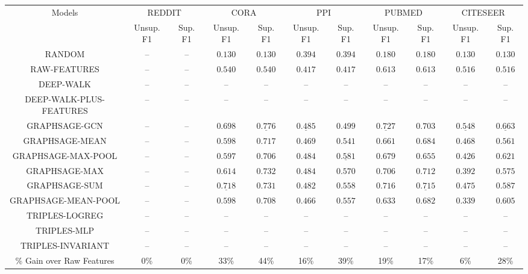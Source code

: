 \begin{tabular}{ccccccccccc}
    \hline
    \multirow{2}{*}{ Models } &
    	\multicolumn{2}{c}{ REDDIT } & 	\multicolumn{2}{c}{ CORA } & 	\multicolumn{2}{c}{ PPI } & 	\multicolumn{2}{c}{ PUBMED } & 	\multicolumn{2}{c}{ CITESEER } \\

    
    \cline { 2 - 11 } &
         Unsup. F1 & Sup. F1 &  Unsup. F1 & Sup. F1 &  Unsup. F1 & Sup. F1 &  Unsup. F1 & Sup. F1 &  Unsup. F1 & Sup. F1  \\
    
    \hline
    	RANDOM & -- & -- & $0.130$ & $0.130$ & $0.394$ & $0.394$ & $0.180$ & $0.180$ & $0.130$ & $0.130$ \\
	RAW-FEATURES & -- & -- & $0.540$ & $0.540$ & $0.417$ & $0.417$ & $0.613$ & $0.613$ & $0.516$ & $0.516$ \\
	DEEP-WALK & -- & -- & -- & -- & -- & -- & -- & -- & -- & -- \\
	DEEP-WALK-PLUS-FEATURES & -- & -- & -- & -- & -- & -- & -- & -- & -- & -- \\
	GRAPHSAGE-GCN & -- & -- & $0.698$ & $\underline{\mathbf{0.776}}$ & $\underline{\mathbf{0.485}}$ & $0.499$ & $\underline{\mathbf{0.727}}$ & $0.703$ & $\underline{\mathbf{0.548}}$ & $\underline{\mathbf{0.663}}$ \\
	GRAPHSAGE-MEAN & -- & -- & $0.598$ & $0.717$ & $0.469$ & $0.541$ & $0.661$ & $0.684$ & $0.468$ & $0.561$ \\
	GRAPHSAGE-MAX-POOL & -- & -- & $0.597$ & $0.706$ & $0.484$ & $\underline{\mathbf{0.581}}$ & $0.679$ & $0.655$ & $0.426$ & $0.621$ \\
	GRAPHSAGE-MAX & -- & -- & $0.614$ & $0.732$ & $0.484$ & $0.570$ & $0.706$ & $0.712$ & $0.392$ & $0.575$ \\
	GRAPHSAGE-SUM & -- & -- & $\underline{\mathbf{0.718}}$ & $0.731$ & $0.482$ & $0.558$ & $0.716$ & $\underline{\mathbf{0.715}}$ & $0.475$ & $0.587$ \\
	GRAPHSAGE-MEAN-POOL & -- & -- & $0.598$ & $0.708$ & $0.466$ & $0.557$ & $0.633$ & $0.682$ & $0.339$ & $0.605$ \\
	TRIPLES-LOGREG & -- & -- & -- & -- & -- & -- & -- & -- & -- & -- \\
	TRIPLES-MLP & -- & -- & -- & -- & -- & -- & -- & -- & -- & -- \\
	TRIPLES-INVARIANT & -- & -- & -- & -- & -- & -- & -- & -- & -- & -- \\

    
    \hline
    \% Gain over Raw Features & 0\% & 0\% & 33\% & 44\% & 16\% & 39\% & 19\% & 17\% & 6\% & 28\% \\
    \hline
    \end{tabular}